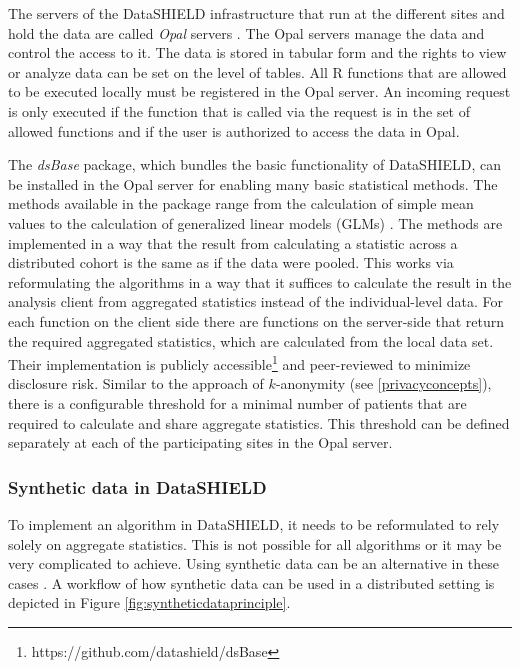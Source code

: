 \documentclass[12pt]{article}
\newcommand{\apkg}[1]{\emph{#1}}
\begin{document}
The servers of the DataSHIELD infrastructure that run at the different sites and hold the data are called {\em Opal} servers \citep{opal}.
The Opal servers manage the data and control the access to it.
The data is stored in tabular form and the rights to view or analyze data can be set on the level of tables.
All R functions that are allowed to be executed locally must be registered in the Opal server.
An incoming request is only executed if the function that is called via the request is in the set of allowed functions and if the user is authorized to access the data in Opal.

The \apkg{dsBase} package, which bundles the basic functionality of DataSHIELD, can be installed in the Opal server for enabling many basic statistical methods.
The methods available in the package range from the calculation of simple mean values to the calculation of generalized linear models (GLMs) \citep{glm_1972, wolfson_datashield}.
The methods are implemented in a way that the result from calculating a statistic across a distributed cohort is the same as if the data were pooled.
This works via reformulating the algorithms in a way that it suffices to calculate the result in the analysis client from aggregated statistics instead of the individual-level data.
For each function on the client side there are functions on the server-side that return the required aggregated statistics, which are calculated from the local data set.
Their implementation is publicly accessible\footnote{https://github.com/datashield/dsBase} and peer-reviewed to minimize disclosure risk.
Similar to the approach of $k$-anonymity (see \ref{privacyconcepts}), there is a configurable threshold for a minimal number of patients that are required to calculate and share aggregate statistics.
This threshold can be defined separately at each of the participating sites in the Opal server.

\subsubsection{Synthetic data in DataSHIELD}\label{syntheticdata_ds}

To implement an algorithm in DataSHIELD, it needs to be reformulated to rely solely on aggregate statistics.
This is not possible for all algorithms or it may be very complicated to achieve.
Using synthetic data can be an alternative in these cases \citep{bonofiglio2020, manriquevallier_bayesian_2018, synthpop, quick_generating_2018}.
A workflow of how synthetic data can be used in a distributed setting is depicted in Figure \ref{fig:syntheticdataprinciple}.
\end{document}
